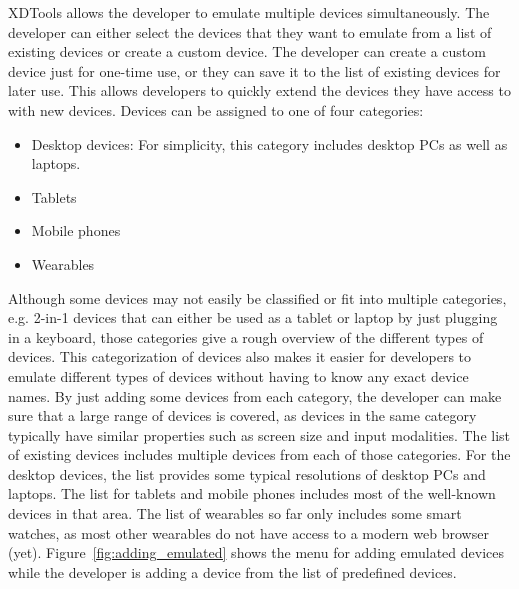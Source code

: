 XDTools allows the developer to emulate multiple devices simultaneously. The developer can either select the devices that they want to emulate from a list of existing devices or create a custom device. The developer can create a custom device just for one-time use, or they can save it to the list of existing devices for later use. This allows developers to quickly extend the devices they have access to with new devices. Devices can be assigned to one of four categories:
\begin{itemize}
	\item Desktop devices: For simplicity, this category includes desktop PCs as well as laptops.
	\item Tablets
	\item Mobile phones
	\item Wearables
\end{itemize}
Although some devices may not easily be classified or fit into multiple categories, e.g. 2-in-1 devices that can either be used as a tablet or laptop by just plugging in a keyboard, those categories give a rough overview of the different types of devices. This categorization of devices also makes it easier for developers to emulate different types of devices without having to know any exact device names. By just adding some devices from each category, the developer can make sure that a large range of devices is covered, as devices in the same category typically have similar properties such as screen size and input modalities. The list of existing devices includes multiple devices from each of those categories. For the desktop devices, the list provides some typical resolutions of desktop PCs and laptops. The list for tablets and mobile phones includes most of the well-known devices in that area. The list of wearables so far only includes some smart watches, as most other wearables do not have access to a modern web browser (yet). Figure~\ref{fig:adding_emulated} shows the menu for adding emulated devices while the developer is adding a device from the list of predefined devices.


